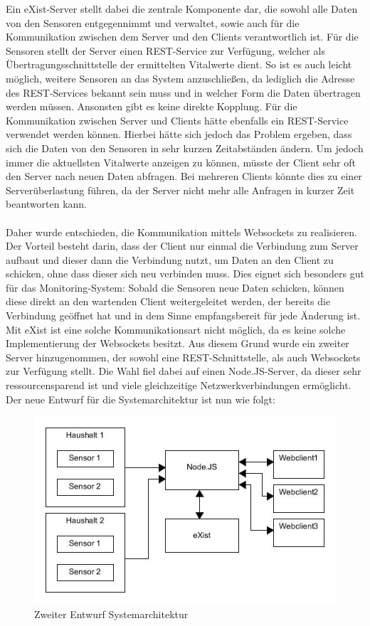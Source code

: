 Ein eXist-Server stellt dabei die zentrale Komponente dar, die sowohl alle Daten von den Sensoren entgegennimmt und verwaltet, sowie auch für die Kommunikation zwischen dem Server und den Clients verantwortlich ist. Für die Sensoren stellt der Server einen REST-Service zur Verfügung, welcher als Übertragungsschnittstelle der ermittelten Vitalwerte dient. So ist es auch leicht möglich, weitere Sensoren an das System anzuschließen, da lediglich die Adresse des REST-Services bekannt sein muss und in welcher Form die Daten übertragen werden müssen. Ansonsten gibt es keine direkte Kopplung. Für die Kommunikation zwischen Server und Clients hätte ebenfalls ein REST-Service verwendet werden können. Hierbei hätte sich jedoch das Problem ergeben, dass sich die Daten von den Sensoren in sehr kurzen Zeitabständen ändern. Um jedoch immer die aktuellsten Vitalwerte anzeigen zu können, müsste der Client sehr oft den Server nach neuen Daten abfragen. Bei mehreren Clients könnte dies zu einer Serverüberlastung führen, da der Server nicht mehr alle Anfragen in kurzer Zeit beantworten kann.
\\
\\
Daher wurde entschieden, die Kommunikation mittels Websockets zu realisieren. Der Vorteil besteht darin, dass der Client nur einmal die Verbindung zum Server aufbaut und dieser dann die Verbindung nutzt, um Daten an den Client zu schicken, ohne dass dieser sich neu verbinden muss. Dies eignet sich besonders gut für das Monitoring-System: Sobald die Sensoren neue Daten schicken, können diese direkt an den wartenden Client weitergeleitet werden, der bereits die Verbindung geöffnet hat und in dem Sinne empfangsbereit für jede Änderung ist. Mit eXist ist eine solche Kommunikationsart nicht möglich, da es keine solche Implementierung der Websockets besitzt. Aus diesem Grund wurde ein zweiter Server hinzugenommen, der sowohl eine REST-Schnittstelle, als auch Websockets zur Verfügung stellt. Die Wahl fiel dabei auf einen Node.JS-Server, da dieser sehr ressourcensparend ist und viele gleichzeitige Netzwerkverbindungen ermöglicht. Der neue Entwurf für die Systemarchitektur ist nun wie folgt:

\begin{figure}[h]
\begin{center}
\includegraphics[scale=0.7]{images/sa2.jpg} 
\caption{Zweiter Entwurf Systemarchitektur}
\end{center}
\end{figure}

